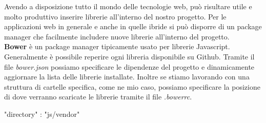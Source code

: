 Avendo a disposizione tutto il mondo delle tecnologie web, può risultare utile e molto produttivo inserire librerie all'interno del nostro progetto. Per le applicazioni web in generale e anche in quelle ibride si può disporre di un package manager che facilmente includere nuove librerie all'interno del progetto.\\

\textbf{Bower} è un package manager tipicamente usato per librerie Javascript. Generalmente è possibile reperire ogni libreria disponibile su Github. Tramite il file \emph{bower.json} possiamo specificare le dipendenze del progetto e dinamicamente aggiornare la lista delle librerie installate. Inoltre se stiamo lavorando con una struttura di cartelle specifica, come ne mio caso, possiamo specificare la posizione di dove verranno scaricate le librerie tramite il file \emph{.bowerrc}. 

\begin{code}[language=html,caption={Una tipica configurazione del file .bowerrc},
				   label={lst:bowerrc}]
	{
		"directory" : "js/vendor"
	}
\end{code}




